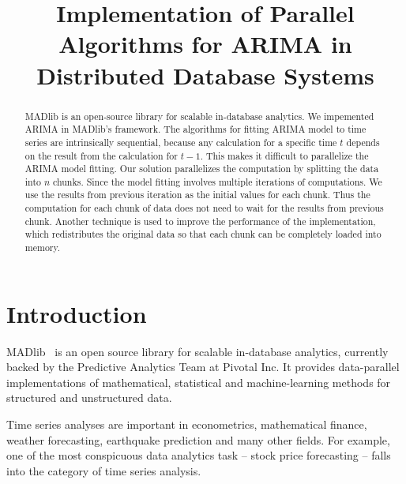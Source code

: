 \documentclass[english,12pt]{article}
\begin{document}
\title{Implementation of Parallel Algorithms for ARIMA in Distributed
  Database Systems}


\maketitle

\begin{abstract}
    MADlib is an open-source library for scalable in-database analytics. We
    impemented ARIMA in MADlib's framework. The algorithms for fitting ARIMA
    model to time series are intrinsically sequential, because any calculation
    for a specific time $t$ depends on the result from the calculation for
    $t-1$.  This makes it difficult to parallelize the ARIMA model fitting. Our
    solution parallelizes the computation by splitting the data into $n$
    chunks. Since the model fitting involves multiple iterations of
    computations. We use the results from previous iteration as the initial
    values for each chunk. Thus the computation for each chunk of data does not
    need to wait for the results from previous chunk. Another technique is used
    to improve the performance of the implementation, which redistributes the
    original data so that each chunk can be completely loaded into memory.
\end{abstract}


\section{Introduction}

MADlib~\cite{madlib} is an open source library for scalable in-database analytics, currently backed by the Predictive Analytics Team at Pivotal Inc.
It provides data-parallel implementations of mathematical, statistical and machine-learning methods for structured and unstructured data.

Time series analyses are important in econometrics, mathematical finance, weather forecasting, earthquake prediction and many other fields.
For example, one of the most conspicuous data analytics task -- stock price forecasting -- falls into the category of time series analysis.
\end{document}

